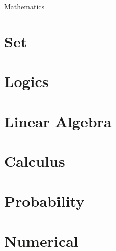 \documentclass[11pt,journal,compsoc]{IEEEtran}
\begin{document}
Mathematics


\section{Set}


\section{Logics}


\section{Linear Algebra}


\section{Calculus}


\section{Probability}


\section{Numerical}
\end{document}
